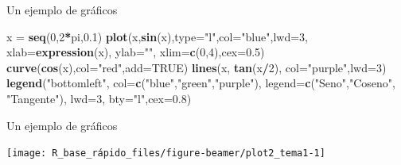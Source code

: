 \documentclass[
  ignorenonframetext,
  aspectratio=169]{beamer}
\newenvironment{Shaded}{\begin{snugshade}}{\end{snugshade}}
\newcommand{\AttributeTok}[1]{\textcolor[rgb]{0.13,0.29,0.53}{#1}}
\newcommand{\ConstantTok}[1]{\textcolor[rgb]{0.56,0.35,0.01}{#1}}
\newcommand{\DecValTok}[1]{\textcolor[rgb]{0.00,0.00,0.81}{#1}}
\newcommand{\FloatTok}[1]{\textcolor[rgb]{0.00,0.00,0.81}{#1}}
\newcommand{\FunctionTok}[1]{\textcolor[rgb]{0.13,0.29,0.53}{\textbf{#1}}}
\newcommand{\NormalTok}[1]{#1}
\newcommand{\OtherTok}[1]{\textcolor[rgb]{0.56,0.35,0.01}{#1}}
\newcommand{\SpecialCharTok}[1]{\textcolor[rgb]{0.81,0.36,0.00}{\textbf{#1}}}
\newcommand{\StringTok}[1]{\textcolor[rgb]{0.31,0.60,0.02}{#1}}
\begin{document}
\begin{frame}[fragile]{Un ejemplo de gráficos}
\label{un-ejemplo-de-gruxe1ficos}
\begin{Shaded}
\begin{Highlighting}[]
\NormalTok{x }\OtherTok{=} \FunctionTok{seq}\NormalTok{(}\DecValTok{0}\NormalTok{,}\DecValTok{2}\SpecialCharTok{*}\NormalTok{pi,}\FloatTok{0.1}\NormalTok{)}
\FunctionTok{plot}\NormalTok{(x,}\FunctionTok{sin}\NormalTok{(x),}\AttributeTok{type=}\StringTok{"l"}\NormalTok{,}\AttributeTok{col=}\StringTok{"blue"}\NormalTok{,}\AttributeTok{lwd=}\DecValTok{3}\NormalTok{, }
     \AttributeTok{xlab=}\FunctionTok{expression}\NormalTok{(x), }\AttributeTok{ylab=}\StringTok{""}\NormalTok{,}
     \AttributeTok{xlim=}\FunctionTok{c}\NormalTok{(}\DecValTok{0}\NormalTok{,}\DecValTok{4}\NormalTok{),}\AttributeTok{cex=}\FloatTok{0.5}\NormalTok{)}
\FunctionTok{curve}\NormalTok{(}\FunctionTok{cos}\NormalTok{(x),}\AttributeTok{col=}\StringTok{"red"}\NormalTok{,}\AttributeTok{add=}\ConstantTok{TRUE}\NormalTok{)}
\FunctionTok{lines}\NormalTok{(x, }\FunctionTok{tan}\NormalTok{(x}\SpecialCharTok{/}\DecValTok{2}\NormalTok{), }\AttributeTok{col=}\StringTok{"purple"}\NormalTok{,}\AttributeTok{lwd=}\DecValTok{3}\NormalTok{)}
\FunctionTok{legend}\NormalTok{(}\StringTok{"bottomleft"}\NormalTok{,}
       \AttributeTok{col=}\FunctionTok{c}\NormalTok{(}\StringTok{"blue"}\NormalTok{,}\StringTok{"green"}\NormalTok{,}\StringTok{"purple"}\NormalTok{),}
       \AttributeTok{legend=}\FunctionTok{c}\NormalTok{(}\StringTok{"Seno"}\NormalTok{,}\StringTok{"Coseno"}\NormalTok{, }\StringTok{"Tangente"}\NormalTok{),}
       \AttributeTok{lwd=}\DecValTok{3}\NormalTok{, }\AttributeTok{bty=}\StringTok{"l"}\NormalTok{,}\AttributeTok{cex=}\FloatTok{0.8}\NormalTok{)}
\end{Highlighting}
\end{Shaded}
\end{frame}

\begin{frame}{Un ejemplo de gráficos}
\label{un-ejemplo-de-gruxe1ficos-1}
\begin{center}\texttt{[image: R\_base\_rápido\_files/figure-beamer/plot2\_tema1-1]} \end{center}
\end{frame}
\end{document}
